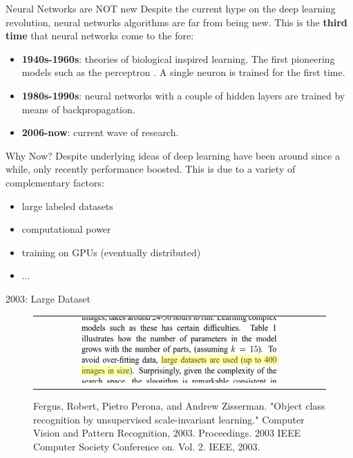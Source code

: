 \documentclass[aspectratio=169]{beamer}
\begin{document}
\begin{frame}{Neural Networks are NOT new}
Despite the current hype on the deep learning revolution, neural networks algorithms are far from being new. This is the \textbf{third time} that neural networks come to the fore:
\begin{itemize}
\item \textbf{1940s-1960s}: theories of biological inspired learning\cite{morris1999hebb,mcculloch1943logical}. The first pioneering models such as the perceptron \cite{rosenblatt1958perceptron}. A single neuron is trained for the first time.
\item \textbf{1980s-1990s}: neural networks with a couple of hidden layers are trained by means of backpropagation\cite{rumelhart1988learning}.
\item \textbf{2006-now}: current wave of research.
\end{itemize}
\end{frame}


\begin{frame}{Why Now?}
Despite underlying ideas of deep learning have been around since a while, only recently performance boosted. This is due to a variety of complementary factors:
\begin{itemize}
\item large labeled datasets
\item computational power
\item training on GPUs (eventually distributed)
\item ...
\end{itemize}

\end{frame}


\begin{frame}{2003: Large Dataset}
\begin{figure}
\begin{tabular}{c}
\includegraphics[width=0.7\textwidth]{img/dnn/2003_large_dataset.png}\\
\end{tabular}
\vspace{0.5cm}
\caption{Fergus, Robert, Pietro Perona, and Andrew Zisserman. "Object class recognition by unsupervised scale-invariant learning." Computer Vision and Pattern Recognition, 2003. Proceedings. 2003 IEEE Computer Society Conference on. Vol. 2. IEEE, 2003.}
\end{figure}
\end{frame}
\end{document}
